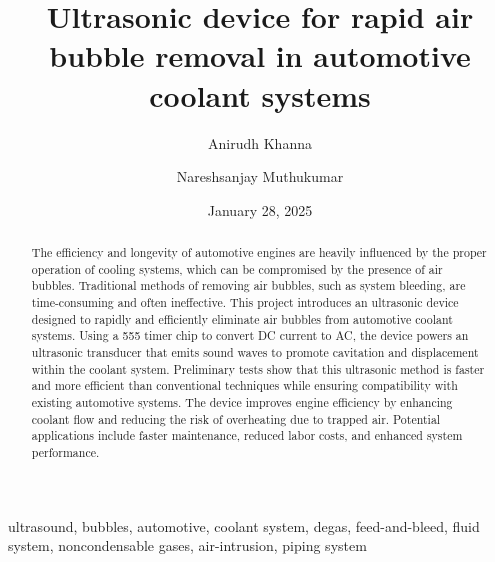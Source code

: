 ﻿\documentclass[12pt,conference,onecolumn]{IEEEtran}
\title{Ultrasonic device for rapid air bubble removal in automotive coolant systems}
\author{Anirudh Khanna \and Nareshsanjay Muthukumar}
\date{January 28, 2025}
\begin{document}
\maketitle 

\begin{abstract}
The efficiency and longevity of automotive engines are heavily influenced by the proper operation of cooling systems, which can be compromised by the presence of air bubbles. Traditional methods of removing air bubbles, such as system bleeding, are time-consuming and often ineffective. This project introduces an ultrasonic device designed to rapidly and efficiently eliminate air bubbles from automotive coolant systems. Using a 555 timer chip to convert DC current to AC, the device powers an ultrasonic transducer that emits sound waves to promote cavitation and displacement within the coolant system. Preliminary tests show that this ultrasonic method is faster and more efficient than conventional techniques while ensuring compatibility with existing automotive systems. The device improves engine efficiency by enhancing coolant flow and reducing the risk of overheating due to trapped air. Potential applications include faster maintenance, reduced labor costs, and enhanced system performance.
\end{abstract}

\begin{IEEEkeywords}
ultrasound, bubbles, automotive, coolant system, degas, feed-and-bleed, fluid system, noncondensable gases, air-intrusion, piping system
\end{IEEEkeywords}
\end{document}
